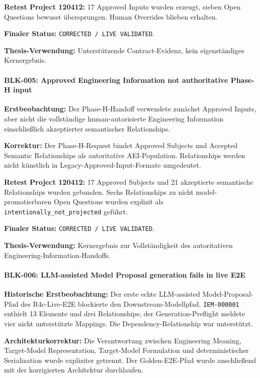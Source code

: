 \textbf{Retest Project 120412:}
17 Approved Inputs wurden erzeugt, sieben Open Questions bewusst übersprungen.
Human Overrides blieben erhalten.

\textbf{Finaler Status:}
\texttt{CORRECTED / LIVE VALIDATED}.

\textbf{Thesis-Verwendung:}
Unterstützende Contract-Evidenz, kein eigenständiges Kernergebnis.


\paragraph{BLK-005: Approved Engineering Information not authoritative Phase-H input}

\textbf{Erstbeobachtung:}
Der Phase-H-Handoff verwendete zunächst Approved Inputs, aber nicht die vollständige
human-autorisierte Engineering Information einschließlich akzeptierter semantischer
Relationships.

\textbf{Korrektur:}
Der Phase-H-Request bindet Approved Subjects und Accepted Semantic Relationships
als autoritative AEI-Population. Relationships werden nicht künstlich in
Legacy-Approved-Input-Formate umgedeutet.

\textbf{Retest Project 120412:}
17 Approved Subjects und 21 akzeptierte semantische Relationships wurden
gebunden. Sechs Relationships zu nicht model-promotierbaren Open Questions wurden
explizit als \texttt{intentionally\_not\_projected} geführt.

\textbf{Finaler Status:}
\texttt{CORRECTED / LIVE VALIDATED}.

\textbf{Thesis-Verwendung:}
Kernergebnis zur Vollständigkeit des autoritativen Engineering-Information-Handoffs.


\paragraph{BLK-006: LLM-assisted Model Proposal generation fails in live E2E}

\textbf{Historische Erstbeobachtung:}
Der erste echte LLM-assisted Model-Proposal-Pfad des R4c-Live-E2E blockierte den
Downstream-Modellpfad. \texttt{IEM-000001} enthielt 13 Elemente und drei
Relationships; der Generation-Preflight meldete vier nicht unterstützte Mappings.
Die Dependency-Relationship war unterstützt.

\textbf{Architekturkorrektur:}
Die Verantwortung zwischen Engineering Meaning, Target-Model Representation,
Target-Model Formulation und deterministischer Serialization wurde expliziter
getrennt. Der Golden-E2E-Pfad wurde anschließend mit der korrigierten Architektur
durchlaufen.

